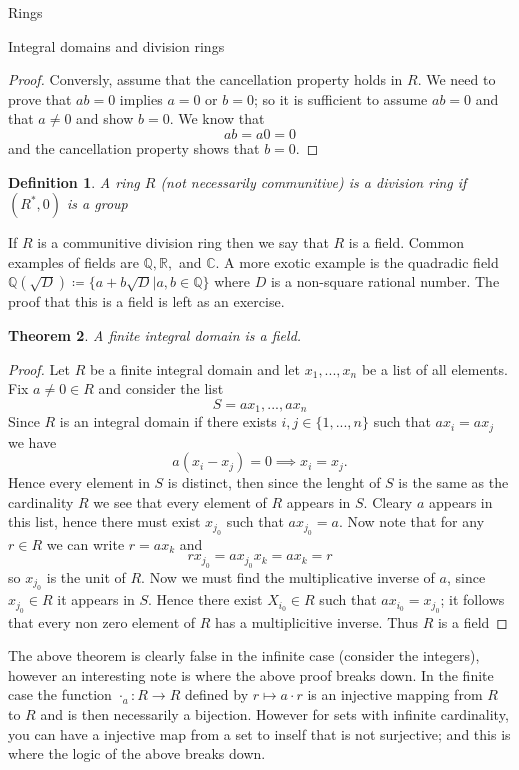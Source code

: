 \documentclass[11pt]{report}
\newcommand{\R}{\mathbb{R}}
\newcommand{\C}{\mathbb{C}}
\newcommand{\Q}{\mathbb{Q}}
\theoremstyle{break}
\newtheorem{thm}{Theorem}[section]
\newtheorem{defn}[thm]{Definition}
\begin{document}
\begin{chapter}{Rings}
\begin{section}{Integral domains and division rings}
\begin{proof}
    Conversly, assume that the cancellation property holds in $R$. We need to prove that $ab = 0$ implies $a =0 $ or $b= 0$; so it 
    is sufficient to assume $ab = 0$ and that $a \neq 0$ and show $b = 0$. We know that 
    \[ab = a0 = 0 \] 
    and the cancellation property shows that  $b = 0$. 
\end{proof}


\begin{defn}
    A ring $R$ (not necessarily communitive) is a division ring if $(R^*, 0)$ is a group
\end{defn}

If $R$ is a communitive  division ring then we say that $R$ is a field. Common examples of fields are $\Q, \R,$ and $\C$. A more 
exotic example is the quadradic field $\Q(\sqrt{D}) \coloneq \{a + b\sqrt{D}| a, b \in \Q\}$ where 
$D$ is a non-square rational number. The proof that this is a field is left as an exercise.  



\begin{thm}
    A finite integral domain is a field. 
\end{thm}


\begin{proof}
    Let $R$ be a finite integral domain and let $x_1, ..., x_n$ be a list of all elements. Fix $a \neq 0 \in R$ and consider the list 
    \[S = ax_1, ..., ax_n\]
    Since $R$ is an integral domain if there exists $i, j \in \{1, ..., n\}$ such that $ax_i = ax_j$ we have 
    \[a(x_i - x_j) = 0 \implies x_i = x_j.\]
    Hence every element in $S$ is distinct, then since the lenght of $S$ is the same as the cardinality $R$ we see that every element of $R$ appears in 
    $S$. Cleary $a$ appears in this list, hence there must exist $x_{j_0}$ such that $ax_{j_0} = a$. Now note that for any $r \in R$ we can write 
    $r = ax_k$ and 
    \[rx_{j_0} = ax_{j_0}x_k = ax_k = r\] 
    so $x_{j_0}$ is the unit of $R$. Now we must find the multiplicative inverse of $a$, since $x_{j_0} \in R$ it appears in $S$. Hence there exist 
    $X_{i_0} \in R$ such that $ax_{i_0} = x_{j_0}$; it follows that every non zero element of $R$ has a multiplicitive inverse.
    Thus $R$ is a field 
\end{proof}

The above theorem is clearly false in the infinite case (consider the integers), however an interesting note is where the above proof breaks down. 
In the finite case the function $\cdot_a: R \to R$ defined by $r \mapsto a \cdot r$ is an injective mapping from $R$ to $R$ and is then necessarily 
a bijection. However for sets with infinite cardinality, you can have a injective map from a set to inself that is not surjective; and this is where the 
logic of the above breaks down.



\end{section}
\end{chapter}
\end{document}
